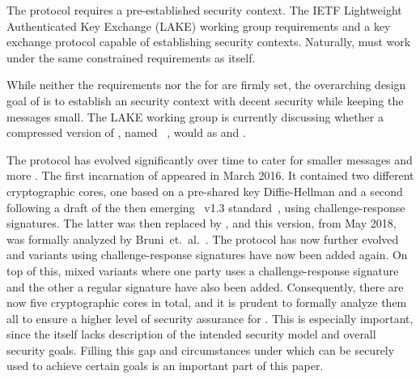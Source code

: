 \documentclass[runningheads,draft,x11names]{llncs}
\begin{document}
The \mOscore{} protocol requires a pre-established security context.
%
The IETF Lightweight Authenticated Key Exchange (LAKE) working group
 requirements and a key exchange protocol  capable of
establishing \mOscore{} security contexts.
%
%
Naturally, \mEdhoc{} must work under the same constrained requirements as
\mOscore{} itself.

%

While neither the requirements nor the  for \mEdhoc{} are firmly set,
the overarching design goal of \mEdhoc{} is to establish an \mOscore{} security
context with decent security while keeping the messages small.
%
The LAKE working group is currently discussing whether a compressed version of
\mTls, named \mCtls~\cite{ietf-tls-ctls-00}, would  as 
\mOscore{} and \mEdhoc{} .
%

The \mEdhoc{} protocol has evolved significantly over time to cater for smaller
messages and more .
%
The first incarnation of \mEdhoc{} appeared in March 2016.
%
It contained two different cryptographic cores, one based on a
pre-shared key Diffie-Hellman and a second following a draft of the
then emerging \mbox{\mTls{} v1.3} standard~\cite{ietf-tls-tls13-11}, using
challenge-response signatures.
%
The latter was then replaced by \mSigma, and this version, from May 2018, was
formally analyzed by Bruni~et.~al.~\cite{DBLP:conf/secsr/BruniJPS18}.
%
The protocol has now further evolved and variants using challenge-response
signatures  have now been added again.
%
On top of this, mixed variants where one party uses a challenge-response
signature and the other a regular signature have also been added.
%
Consequently, there are now five cryptographic cores in total, and it is prudent
to formally analyze them all to ensure a higher level of security assurance for
\mEdhoc.
%
This is especially important, since the \mSpec{} itself lacks  description of the
intended security model and overall security goals.
%
Filling this gap and  circumstances under which \mEdhoc{} can be
securely used to achieve certain  goals is an important part of this paper.
%
\end{document}
